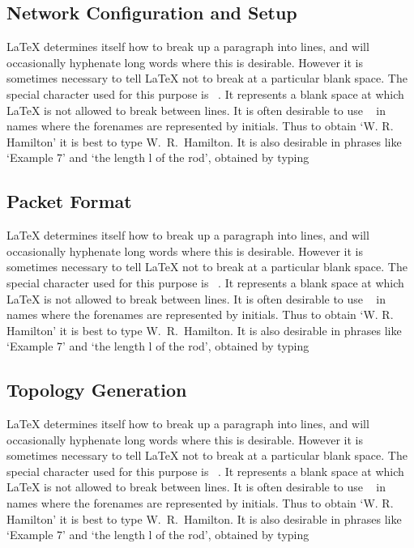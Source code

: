 \documentclass[12pt]{report}
\begin{document}
\subsection{Network Configuration and Setup}

LaTeX determines itself how to break up a paragraph into lines, and will occasionally hyphenate long words where this is desirable. However it is sometimes necessary to tell LaTeX not to break at a particular blank space. The special character used for this purpose is ~. It represents a blank space at which LaTeX is not allowed to break between lines. It is often desirable to use ~ in names where the forenames are represented by initials. Thus to obtain `W. R. Hamilton' it is best to type W.~R.~Hamilton. It is also desirable in phrases like `Example 7' and `the length l of the rod', obtained by typing



\subsection{Packet Format}

LaTeX determines itself how to break up a paragraph into lines, and will occasionally hyphenate long words where this is desirable. However it is sometimes necessary to tell LaTeX not to break at a particular blank space. The special character used for this purpose is ~. It represents a blank space at which LaTeX is not allowed to break between lines. It is often desirable to use ~ in names where the forenames are represented by initials. Thus to obtain `W. R. Hamilton' it is best to type W.~R.~Hamilton. It is also desirable in phrases like `Example 7' and `the length l of the rod', obtained by typing



\subsection{Topology Generation}

LaTeX determines itself how to break up a paragraph into lines, and will occasionally hyphenate long words where this is desirable. However it is sometimes necessary to tell LaTeX not to break at a particular blank space. The special character used for this purpose is ~. It represents a blank space at which LaTeX is not allowed to break between lines. It is often desirable to use ~ in names where the forenames are represented by initials. Thus to obtain `W. R. Hamilton' it is best to type W.~R.~Hamilton. It is also desirable in phrases like `Example 7' and `the length l of the rod', obtained by typing
\end{document}
